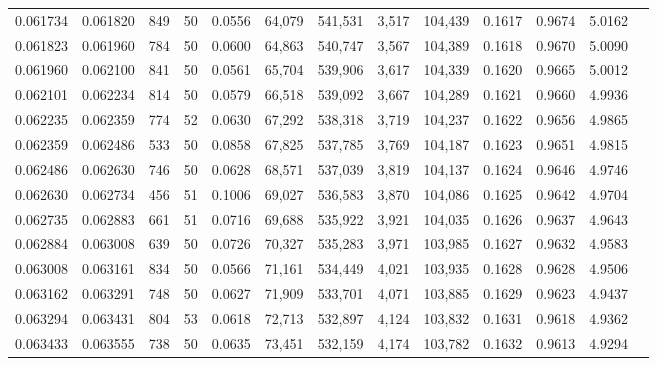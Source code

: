 \begin{tabular}{rrrrrrrrrrrrr}
0.061734 & 0.061820 &   849 &  50 &                                     0.0556 &  64,079 & 541,531 &   3,517 & 104,439 & 0.1617 & 0.9674 & 5.0162 \\
0.061823 & 0.061960 &   784 &  50 &                                     0.0600 &  64,863 & 540,747 &   3,567 & 104,389 & 0.1618 & 0.9670 & 5.0090 \\
0.061960 & 0.062100 &   841 &  50 &                                     0.0561 &  65,704 & 539,906 &   3,617 & 104,339 & 0.1620 & 0.9665 & 5.0012 \\
0.062101 & 0.062234 &   814 &  50 &                                     0.0579 &  66,518 & 539,092 &   3,667 & 104,289 & 0.1621 & 0.9660 & 4.9936 \\
0.062235 & 0.062359 &   774 &  52 &                                     0.0630 &  67,292 & 538,318 &   3,719 & 104,237 & 0.1622 & 0.9656 & 4.9865 \\
0.062359 & 0.062486 &   533 &  50 &                                     0.0858 &  67,825 & 537,785 &   3,769 & 104,187 & 0.1623 & 0.9651 & 4.9815 \\
0.062486 & 0.062630 &   746 &  50 &                                     0.0628 &  68,571 & 537,039 &   3,819 & 104,137 & 0.1624 & 0.9646 & 4.9746 \\
0.062630 & 0.062734 &   456 &  51 &                                     0.1006 &  69,027 & 536,583 &   3,870 & 104,086 & 0.1625 & 0.9642 & 4.9704 \\
0.062735 & 0.062883 &   661 &  51 &                                     0.0716 &  69,688 & 535,922 &   3,921 & 104,035 & 0.1626 & 0.9637 & 4.9643 \\
0.062884 & 0.063008 &   639 &  50 &                                     0.0726 &  70,327 & 535,283 &   3,971 & 103,985 & 0.1627 & 0.9632 & 4.9583 \\
0.063008 & 0.063161 &   834 &  50 &                                     0.0566 &  71,161 & 534,449 &   4,021 & 103,935 & 0.1628 & 0.9628 & 4.9506 \\
0.063162 & 0.063291 &   748 &  50 &                                     0.0627 &  71,909 & 533,701 &   4,071 & 103,885 & 0.1629 & 0.9623 & 4.9437 \\
0.063294 & 0.063431 &   804 &  53 &                                     0.0618 &  72,713 & 532,897 &   4,124 & 103,832 & 0.1631 & 0.9618 & 4.9362 \\
0.063433 & 0.063555 &   738 &  50 &                                     0.0635 &  73,451 & 532,159 &   4,174 & 103,782 & 0.1632 & 0.9613 & 4.9294 \\

\end{tabular}
